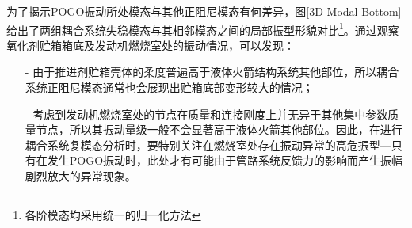 为了揭示POGO振动所处模态与其他正阻尼模态有何差异，图\ref{3D-Modal-Bottom}给出了两组耦合系统失稳模态与其相邻模态之间的局部振型形貌对比\footnote{各阶模态均采用统一的归一化方法}。通过观察氧化剂贮箱箱底及发动机燃烧室处的振动情况，可以发现：
\begin{itemize}
	\item[-] 由于推进剂贮箱壳体的柔度普遍高于液体火箭结构系统其他部位，所以耦合系统正阻尼模态通常也会展现出贮箱底部变形较大的情况；
	\item[-] 考虑到发动机燃烧室处的节点在质量和连接刚度上并无异于其他集中参数质量节点，所以其振动量级一般不会显著高于液体火箭其他部位。因此，在进行耦合系统复模态分析时，要特别关注在燃烧室处存在振动异常的高危振型---只有在发生POGO振动时，此处才有可能由于管路系统反馈力的影响而产生振幅剧烈放大的异常现象。
\end{itemize}







